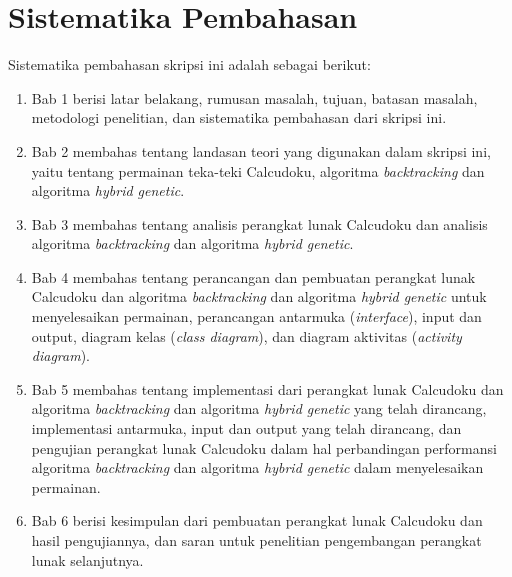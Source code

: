 \section{Sistematika Pembahasan}
\label{sec:sispem}
Sistematika pembahasan skripsi ini adalah sebagai berikut:
\begin{enumerate}
\item Bab 1 berisi latar belakang, rumusan masalah, tujuan, batasan masalah, metodologi penelitian, dan sistematika pembahasan dari skripsi ini.
\item Bab 2 membahas tentang landasan teori yang digunakan dalam skripsi ini, yaitu tentang permainan teka-teki Calcudoku, algoritma \textit{backtracking} dan algoritma \textit{hybrid genetic}.
\item Bab 3 membahas tentang analisis perangkat lunak Calcudoku dan analisis algoritma \textit{backtracking} dan algoritma \textit{hybrid genetic}.
\item Bab 4 membahas tentang perancangan dan pembuatan perangkat lunak Calcudoku dan algoritma \textit{backtracking} dan algoritma \textit{hybrid genetic} untuk menyelesaikan permainan, perancangan antarmuka (\textit{interface}), input dan output, diagram kelas (\textit{class diagram}), dan diagram aktivitas (\textit{activity diagram}).
\item Bab 5 membahas tentang implementasi dari perangkat lunak Calcudoku dan algoritma \textit{backtracking} dan algoritma \textit{hybrid genetic} yang telah dirancang, implementasi antarmuka, input dan output yang telah dirancang, dan pengujian perangkat lunak Calcudoku dalam hal perbandingan performansi algoritma \textit{backtracking} dan algoritma \textit{hybrid genetic} dalam menyelesaikan permainan.
\item Bab 6 berisi kesimpulan dari pembuatan perangkat lunak Calcudoku dan hasil pengujiannya, dan saran untuk penelitian pengembangan perangkat lunak selanjutnya.
\end{enumerate}